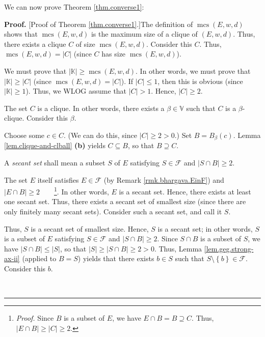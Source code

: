 \documentclass[numbers=enddot,12pt,final,onecolumn,notitlepage]{scrartcl}%
\theoremstyle{definition}
\newenvironment{proof}[1][Proof]{\noindent\textbf{#1.} }{\ \rule{0.5em}{0.5em}}
\renewcommand{\leq}{\leqslant}
\renewcommand{\geq}{\geqslant}
\theoremstyle{plainsl}
\begin{document}
We can now prove Theorem \ref{thm.converse1}:

\begin{proof}
[Proof of Theorem \ref{thm.converse1}.]The definition of $\operatorname*{mcs}%
\left(  E,w,d\right)  $ shows that $\operatorname*{mcs}\left(  E,w,d\right)  $
is the maximum size of a clique of $\left(  E,w,d\right)  $. Thus, there
exists a clique $C$ of size $\operatorname*{mcs}\left(  E,w,d\right)  $.
Consider this $C$. Thus, $\operatorname*{mcs}\left(  E,w,d\right)  =\left\vert
C\right\vert $ (since $C$ has size $\operatorname*{mcs}\left(  E,w,d\right)  $).

We must prove that $\left\vert \mathbb{K}\right\vert \geq\operatorname*{mcs}%
\left(  E,w,d\right)  $. In other words, we must prove that $\left\vert
\mathbb{K}\right\vert \geq\left\vert C\right\vert $ (since
$\operatorname*{mcs}\left(  E,w,d\right)  =\left\vert C\right\vert $). If
$\left\vert C\right\vert \leq1$, then this is obvious (since $\left\vert
\mathbb{K}\right\vert \geq1$). Thus, we WLOG assume that $\left\vert
C\right\vert >1$. Hence, $\left\vert C\right\vert \geq2$.

The set $C$ is a clique. In other words, there exists a $\beta\in\mathbb{V}$
such that $C$ is a $\beta$-clique. Consider this $\beta$.

Choose some $c\in C$. (We can do this, since $\left\vert C\right\vert \geq
2>0$.) Set $B=B_{\beta}\left(  c\right)  $. Lemma \ref{lem.clique-and-clball}
\textbf{(b)} yields $C\subseteq B$, so that $B\supseteq C$.

A \textit{secant set} shall mean a subset $S$ of $E$ satisfying $S\in
\mathcal{F}$ and $\left\vert S\cap B\right\vert \geq2$.

The set $E$ itself satisfies $E\in\mathcal{F}$ (by Remark
\ref{rmk.bhargava.EinF}) and $\left\vert E\cap B\right\vert \geq
2$\ \ \ \ \footnote{\textit{Proof.} Since $B$ is a subset of $E$, we have
$E\cap B=B\supseteq C$. Thus, $\left\vert E\cap B\right\vert \geq\left\vert
C\right\vert \geq2$.}. In other words, $E$ is a secant set. Hence, there
exists at least one secant set. Thus, there exists a secant set of smallest
size (since there are only finitely many secant sets). Consider such a secant
set, and call it $S$.

Thus, $S$ is a secant set of smallest size. Hence, $S$ is a secant set; in
other words, $S$ is a subset of $E$ satisfying $S\in\mathcal{F}$ and
$\left\vert S\cap B\right\vert \geq2$. Since $S\cap B$ is a subset of $S$, we
have $\left\vert S\cap B\right\vert \leq\left\vert S\right\vert $, so that
$\left\vert S\right\vert \geq\left\vert S\cap B\right\vert \geq2>0$. Thus,
Lemma \ref{lem.geg.strong-ax-ii} (applied to $B=S$) yields that there exists
$b\in S$ such that $S\setminus\left\{  b\right\}  \in\mathcal{F}$. Consider
this $b$.


\end{proof}
\end{document}
